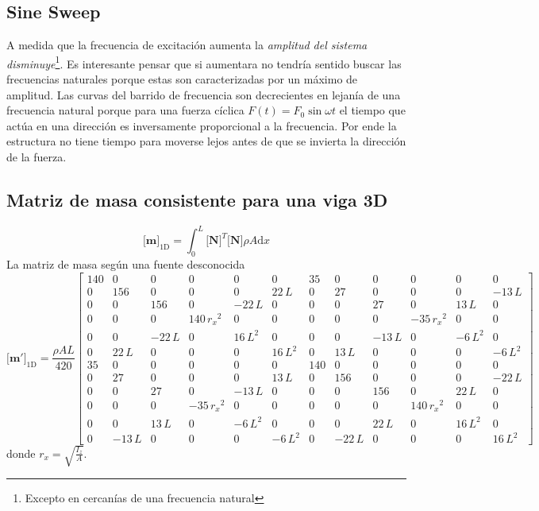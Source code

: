 \documentclass[11pt, a4paper,titlepage]{article}
\newcommand{\di}{\textrm{d}}
\newcommand{\Mme}[1]{\boldsymbol{[}\mathbf{#1} \boldsymbol{]}}
\newcommand{\MN}{\Mme{N}}
\begin{document}
\subsection*{Sine Sweep}
A medida que la frecuencia de excitación aumenta la \textit{amplitud del sistema disminuye}\footnote{Excepto en cercanías de una frecuencia natural}. Es interesante pensar que si aumentara no tendría sentido buscar las frecuencias naturales porque estas son caracterizadas por un máximo de amplitud. Las curvas del barrido de frecuencia son decrecientes en lejanía de una frecuencia natural porque para una fuerza cíclica $F(t)=F_0\sin \omega t$ el tiempo que actúa en una dirección es inversamente proporcional a la frecuencia. Por ende la estructura no tiene tiempo para moverse lejos antes de que se invierta la dirección de la fuerza.

\subsection*{Matriz de masa consistente para una viga 3D}
  \begin{equation}
  	\Mme{m}_{\mathrm{1D}} = \int_0^L \MN^T \MN \rho A \di x
  \end{equation}
  La matriz de masa según una fuente desconocida
  \begin{equation}
  	\Mme{m'}_{\mathrm{1D}}= \frac{\rho A L}{420}\left[\begin{array}{cccccccccccc} 140 & 0 & 0 & 0 & 0 & 0 & 35 & 0 & 0 & 0 & 0 & 0\\ 0 & 156 & 0 & 0 & 0 & 22\,L & 0 & 27 & 0 & 0 & 0 & -13\,L\\ 0 & 0 & 156 & 0 & -22\,L & 0 & 0 & 0 & 27 & 0 & 13\,L & 0\\ 0 & 0 & 0 & 140\,{r_{x}}^2 & 0 & 0 & 0 & 0 & 0 & -35\,{r_{x}}^2 & 0 & 0\\ 0 & 0 & -22\,L & 0 & 16\,L^2 & 0 & 0 & 0 & -13\,L & 0 & -6\,L^2 & 0\\ 0 & 22\,L & 0 & 0 & 0 & 16\,L^2 & 0 & 13\,L & 0 & 0 & 0 & -6\,L^2\\ 35 & 0 & 0 & 0 & 0 & 0 & 140 & 0 & 0 & 0 & 0 & 0\\ 0 & 27 & 0 & 0 & 0 & 13\,L & 0 & 156 & 0 & 0 & 0 & -22\,L\\ 0 & 0 & 27 & 0 & -13\,L & 0 & 0 & 0 & 156 & 0 & 22\,L & 0\\ 0 & 0 & 0 & -35\,{r_{x}}^2 & 0 & 0 & 0 & 0 & 0 & 140\,{r_{x}}^2 & 0 & 0\\ 0 & 0 & 13\,L & 0 & -6\,L^2 & 0 & 0 & 0 & 22\,L & 0 & 16\,L^2 & 0\\ 0 & -13\,L & 0 & 0 & 0 & -6\,L^2 & 0 & -22\,L & 0 & 0 & 0 & 16\,L^2 \end{array}\right]	
  \end{equation}
donde $r_x =\sqrt{ \frac{I_z}{A}}$. 
\end{document}
